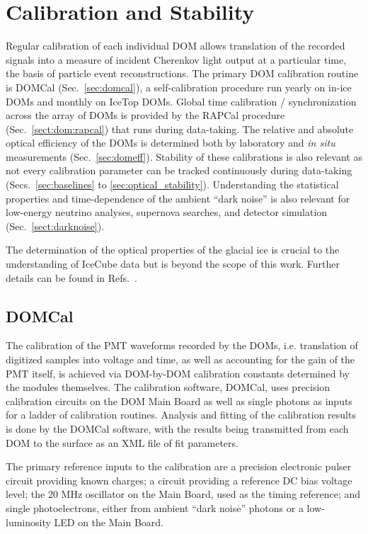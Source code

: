 \section{\label{sec:dom_calibration} Calibration and Stability}

Regular calibration of each individual DOM allows translation of the
recorded signals into a measure of incident Cherenkov light output at a
particular time, the basis of particle event reconstructions.  The
primary DOM calibration routine is DOMCal (Sec.~\ref{sec:domcal}), a
self-calibration procedure run yearly on in-ice DOMs and monthly on IceTop
DOMs.  Global time calibration / synchronization across the array of DOMs is
provided by the RAPCal procedure (Sec.~\ref{sect:dom:rapcal}) that runs during
data-taking.  The relative and absolute optical efficiency of the DOMs is
determined both by laboratory and \emph{in situ} measurements
(Sec.~\ref{sec:domeff}).  Stability of these calibrations is also relevant
as not every calibration parameter can be tracked continuously during
data-taking (Secs.~\ref{sec:baselines} to \ref{sec:optical_stability}).
Understanding the statistical properties and time-dependence of the ambient ``dark
noise'' is also relevant for low-energy neutrino analyses, supernova
searches, and detector simulation (Sec.~\ref{sect:darknoise}).

The determination of the optical properties of the glacial ice is crucial to
the understanding of IceCube data but is beyond the scope of this work.
Further details can be found in Refs.~\cite{Aartsen:2013rt,IC3:spice_lea}.

\subsection{\label{sec:domcal} DOMCal}

The calibration of the PMT waveforms recorded by the DOMs, i.e. translation
of digitized samples into voltage and time, as well as accounting for the
gain of the PMT itself, is achieved via DOM-by-DOM calibration constants
determined by the modules themselves.  The calibration software, DOMCal,
uses precision calibration 
circuits on the DOM Main Board as well as single photons as inputs
for a ladder of calibration routines.  Analysis and fitting of the
calibration results is done by the DOMCal software, with the results being
transmitted from each DOM to the surface as an XML file of fit parameters.

The primary reference inputs to the calibration are a precision electronic
pulser circuit providing known charges; a circuit providing a reference DC
bias voltage level; the 20 MHz oscillator on the Main
Board, used as the timing reference; and single photoelectrons, either from
ambient ``dark noise'' photons or a low-luminosity LED on the Main Board.

